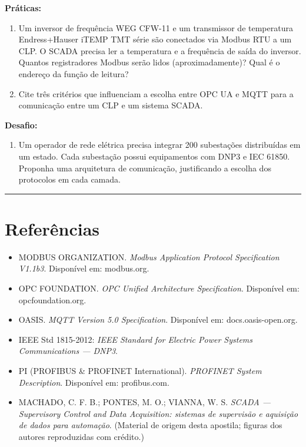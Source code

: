 \textbf{Práticas:}

\begin{enumerate}
\def\labelenumi{\arabic{enumi}.}
\setcounter{enumi}{3}
\tightlist
\item
  Um inversor de frequência WEG CFW-11 e um transmissor de temperatura Endress+Hauser iTEMP TMT série são conectados via Modbus RTU a um CLP. O SCADA precisa ler a temperatura e a frequência de saída do inversor. Quantos registradores Modbus serão lidos (aproximadamente)? Qual é o endereço da função de leitura?
\item
  Cite três critérios que influenciam a escolha entre OPC UA e MQTT para a comunicação entre um CLP e um sistema SCADA.
\end{enumerate}

\textbf{Desafio:}

\begin{enumerate}
\def\labelenumi{\arabic{enumi}.}
\setcounter{enumi}{5}
\tightlist
\item
  Um operador de rede elétrica precisa integrar 200 subestações distribuídas em um estado. Cada subestação possui equipamentos com DNP3 e IEC 61850. Proponha uma arquitetura de comunicação, justificando a escolha dos protocolos em cada camada.
\end{enumerate}

\begin{center}\rule{0.5\linewidth}{0.5pt}\end{center}

\section{Referências}\label{referuxeancias}

\begin{itemize}
\tightlist
\item
  MODBUS ORGANIZATION. \emph{Modbus Application Protocol Specification V1.1b3}. Disponível em: modbus.org.
\item
  OPC FOUNDATION. \emph{OPC Unified Architecture Specification}. Disponível em: opcfoundation.org.
\item
  OASIS. \emph{MQTT Version 5.0 Specification}. Disponível em: docs.oasis-open.org.
\item
  IEEE Std 1815-2012: \emph{IEEE Standard for Electric Power Systems Communications --- DNP3}.
\item
  PI (PROFIBUS \& PROFINET International). \emph{PROFINET System Description}. Disponível em: profibus.com.
\item
  MACHADO, C. F. B.; PONTES, M. O.; VIANNA, W. S. \emph{SCADA --- Supervisory Control and Data
  Acquisition: sistemas de supervisão e aquisição de dados para automação}. (Material de origem desta
  apostila; figuras dos autores reproduzidas com crédito.)
\end{itemize}
